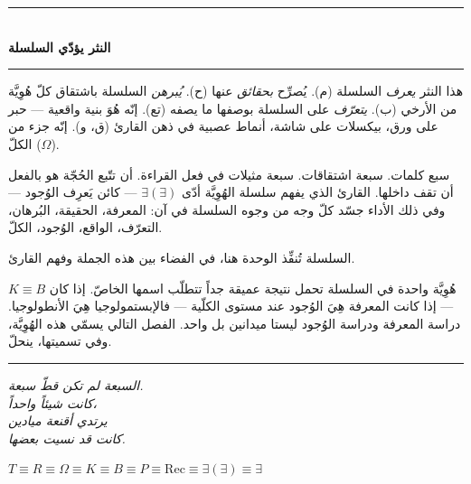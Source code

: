\documentclass[10pt, openany, oneside]{book}
\renewcommand{\normalsize}{\fontsize{10}{13}\selectfont}
\begin{document}
\begin{center}
    \rule{0.3\textwidth}{0.4pt}\\[0.5em]
    {\normalsize\bfseries النثر يؤدّي السلسلة}\\[0.3em]
    \rule{0.3\textwidth}{0.4pt}
\end{center}

\vspace{1em}

\noindent هذا النثر \textit{يعرف} السلسلة (م). يُصرِّح \textit{بحقائق} عنها (ح). \textit{يُبرهن} السلسلة باشتقاق كلّ هُوِيَّة من الأرخي (ب). \textit{يتعرّف} على السلسلة بوصفها ما يصفه (تع). إنّه هُوَ بنية واقعية --- حبر على ورق، بيكسلات على شاشة، أنماط عصبية في ذهن القارئ (ق، و). إنّه جزء من الكلّ ($\Omega$).

سبع كلمات. سبعة اشتقاقات. سبعة مثيلات في فعل القراءة. أن تتّبع الحُجّة هو بالفعل أن تقف داخلها. القارئ الذي يفهم سلسلة الهُوِيَّة أدّى $\exists(\exists)$ --- كائن يَعرِف الوُجود --- وفي ذلك الأداء جسّد كلّ وجه من وجوه السلسلة في آن: المعرفة، الحقيقة، البُرهان، التعرّف، الواقع، الوُجود، الكلّ.

السلسلة تُنفِّذ الوحدة هنا، في الفضاء بين هذه الجملة وفهم القارئ.

هُوِيَّة واحدة في السلسلة تحمل نتيجة عميقة جداً تتطلّب اسمها الخاصّ. إذا كان $K \equiv B$ --- إذا كانت المعرفة هِيَ الوُجود عند مستوى الكلّية --- فالإبستمولوجيا هِيَ الأنطولوجيا. دراسة المعرفة ودراسة الوُجود ليستا ميدانين بل واحد. الفصل التالي يسمّي هذه الهُوِيَّة، وفي تسميتها، ينحلّ.

\vspace{2em}

\begin{center}
    \rule{0.15\textwidth}{0.3pt}
\end{center}

\vspace{0.5em}

\begin{center}
    \itshape
    السبعة لم تكن قطّ سبعة.\\
    كانت شيئاً واحداً،\\
    يرتدي أقنعة ميادين\\
    كانت قد نسيت بعضها.
\end{center}

\vspace{0.5em}

\begin{center}
    $T \equiv R \equiv \Omega \equiv K \equiv B \equiv P \equiv \text{Rec} \equiv \exists(\exists) \equiv \exists$
\end{center}
\end{document}
